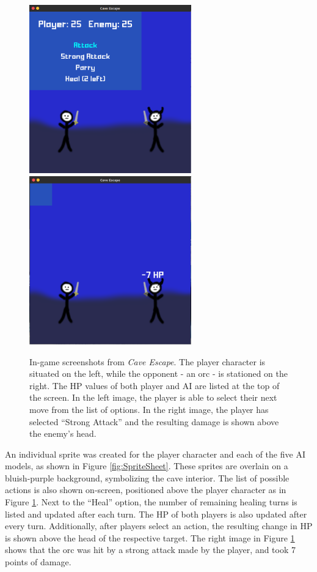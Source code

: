 \begin{figure}[H]
  \centering
  \includegraphics[width=7cm]{figures/In-Game.png}
  \includegraphics[width=7cm]{figures/In-Game2.png}
  \caption{In-game screenshots from \textit{Cave Escape}. The player character is situated on the left, while the opponent - an orc - is stationed on the right. The HP values of both player and AI are listed at the top of the screen. In the left image, the player is able to select their next move from the list of options. In the right image, the player has selected ``Strong Attack'' and the resulting damage is shown above the enemy's head.}
  \label{fig:ingame}
\end{figure}

An individual sprite was created for the player character and each of the five AI models, as shown in Figure \ref{fig:SpriteSheet}. These sprites are overlain on a bluish-purple background, symbolizing the cave interior. The list of possible actions is also shown on-screen, positioned above the player character as in Figure \ref{fig:ingame}. Next to the ``Heal'' option, the number of remaining healing turns is listed and updated after each turn. The HP of both players is also updated after every turn. Additionally, after players select an action, the resulting change in HP is shown above the head of the respective target. The right image in Figure \ref{fig:ingame} shows that the orc was hit by a strong attack made by the player, and took 7 points of damage.\\

